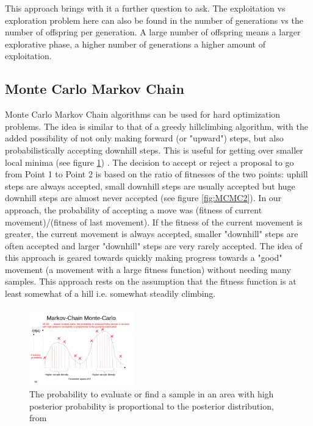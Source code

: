 This approach brings with it a further question to ask. The exploitation vs exploration problem here can also be found in the number of generations vs the number of offspring per generation. A large number of offspring means a larger explorative phase, a higher number of generations a higher amount of exploitation.

\subsection{Monte Carlo Markov Chain} \label{sec:MCMC}

Monte Carlo Markov Chain algorithms can be used for hard optimization problems. The idea is similar to that of a greedy hillclimbing algorithm, with the added possibility of not only making forward (or "upward") steps, but also probabilistically accepting downhill steps. This is useful for getting over smaller local minima (see figure \ref{fig:MCMC1}) \cite{MCMC}. The decision to accept or reject a proposal to go from Point 1 to Point 2 is based on the ratio of fitnesses of the two points: uphill steps are always accepted, small downhill steps are usually accepted but huge downhill steps are almost never accepted (see figure \ref{fig:MCMC2}). In our approach, the probability of accepting a move was (fitness of current movement)/(fitness of last movement). If the fitness of the current movement is greater, the current movement is always accepted, smaller "downhill" steps are often accepted and larger "downhill" steps are very rarely accepted. The idea of this approach is geared towards quickly making progress towards a "good" movement (a movement with a large fitness function) without needing many samples. This approach rests on the assumption that the fitness function is at least somewhat of a hill i.e. somewhat steadily climbing.


\begin{figure}
	\begin{center}
		\includegraphics[trim = 0cm 1.5cm 1cm 5.4cm, clip, width=0.4\textwidth]{lecture12-seiten-46}
	\end{center}
	\caption{The probability to evaluate or find a sample in an area with high posterior probability is proportional to the posterior distribution, from \cite{MCMC}}
	\label{fig:MCMC1}
\end{figure}

